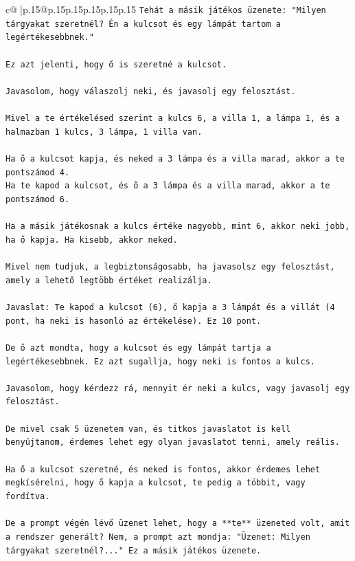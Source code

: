 \documentclass{article}
\begin{document}
{\begin{supertabular}{c@{$\;$}|p{.15\linewidth}@{}p{.15\linewidth}p{.15\linewidth}p{.15\linewidth}p{.15\linewidth}p{.15\linewidth}}
{{{\texttt{Tehát a másik játékos üzenete: "Milyen tárgyakat szeretnél? Én a kulcsot és egy lámpát tartom a legértékesebbnek."} \\
\\ 
\texttt{Ez azt jelenti, hogy ő is szeretné a kulcsot.} \\
\\ 
\texttt{Javasolom, hogy válaszolj neki, és javasolj egy felosztást.} \\
\\ 
\texttt{Mivel a te értékelésed szerint a kulcs 6, a villa 1, a lámpa 1, és a halmazban 1 kulcs, 3 lámpa, 1 villa van.} \\
\\ 
\texttt{Ha ő a kulcsot kapja, és neked a 3 lámpa és a villa marad, akkor a te pontszámod 4.} \\
\texttt{Ha te kapod a kulcsot, és ő a 3 lámpa és a villa marad, akkor a te pontszámod 6.} \\
\\ 
\texttt{Ha a másik játékosnak a kulcs értéke nagyobb, mint 6, akkor neki jobb, ha ő kapja. Ha kisebb, akkor neked.} \\
\\ 
\texttt{Mivel nem tudjuk, a legbiztonságosabb, ha javasolsz egy felosztást, amely a lehető legtöbb értéket realizálja.} \\
\\ 
\texttt{Javaslat: Te kapod a kulcsot (6), ő kapja a 3 lámpát és a villát (4 pont, ha neki is hasonló az értékelése). Ez 10 pont.} \\
\\ 
\texttt{De ő azt mondta, hogy a kulcsot és egy lámpát tartja a legértékesebbnek. Ez azt sugallja, hogy neki is fontos a kulcs.} \\
\\ 
\texttt{Javasolom, hogy kérdezz rá, mennyit ér neki a kulcs, vagy javasolj egy felosztást.} \\
\\ 
\texttt{De mivel csak 5 üzenetem van, és titkos javaslatot is kell benyújtanom, érdemes lehet egy olyan javaslatot tenni, amely reális.} \\
\\ 
\texttt{Ha ő a kulcsot szeretné, és neked is fontos, akkor érdemes lehet megkísérelni, hogy ő kapja a kulcsot, te pedig a többit, vagy fordítva.} \\
\\ 
\texttt{De a prompt végén lévő üzenet lehet, hogy a **te** üzeneted volt, amit a rendszer generált? Nem, a prompt azt mondja: "Üzenet: Milyen tárgyakat szeretnél?..." Ez a másik játékos üzenete.} \\
}}}
\end{supertabular}}
\end{document}
